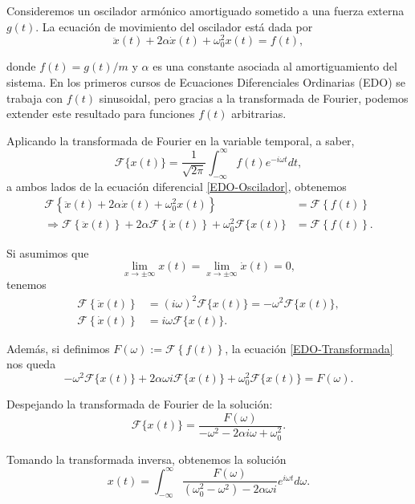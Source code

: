 \begin{ejemplo}
  Consideremos un oscilador armónico amortiguado sometido a una fuerza externa $g(t)$. La ecuación de movimiento del oscilador está dada por
\begin{equation}
 \ddot{x}(t) + 2 \alpha \dot{x}(t) + \omega_0^2 x(t) = f(t), \label{EDO-Oscilador}   
\end{equation}

donde $f(t) = g(t)/m$ y $\alpha$ es una constante asociada al amortiguamiento del sistema. En los primeros cursos de Ecuaciones Diferenciales Ordinarias (EDO) se trabaja con $f(t)$ sinusoidal, pero gracias a la transformada de Fourier, podemos extender este resultado para funciones $f(t)$ arbitrarias. 

Aplicando la transformada de Fourier en la variable temporal, a saber,
\begin{equation}
\mathcal{F}\{x(t)\} = \frac{1}{\sqrt{2\pi}} \int_{-\infty}^{\infty} f(t) e^{-i\omega t} dt,     
\end{equation}
a ambos lados de la ecuación diferencial \eqref{EDO-Oscilador}, obtenemos 
\begin{align}
    \mathcal{F}\left\{ \ddot{x}(t) + 2 \alpha \dot{x}(t) + \omega_0^2 x(t)\right\} &= \mathcal{F}\left\{ f(t)\right\} \nonumber\\
    \Rightarrow   \mathcal{F}\left\{ \ddot{x}(t) \right\} + 2\alpha \mathcal{F}\left\{ \dot{x}(t) \right\} + \omega_0^2 \mathcal{F}\{x(t)\} &= \mathcal{F}\left\{ f(t)\right\}. \label{EDO-Transformada}
\end{align}

Si asumimos que 
\begin{equation}
 \lim_{x \to \pm \infty} x(t) = \lim_{x \to \pm \infty} \dot{x}(t) = 0,   
\end{equation}
tenemos 
\begin{align*}
     \mathcal{F}\left\{ \ddot{x}(t) \right\} &= (i\omega)^2 \mathcal{F}\{x(t)\} = - \omega^2 \mathcal{F}\{x(t)\},\\
      \mathcal{F}\left\{ \dot{x}(t) \right\} &= i \omega \mathcal{F}\{x(t)\}.
\end{align*}

Además, si definimos $F(\omega) := \mathcal{F}\left\{ f(t)\right\}$, la ecuación \eqref{EDO-Transformada} nos queda
\begin{equation}
- \omega^2 \mathcal{F}\{x(t)\} + 2 \alpha \omega i \mathcal{F}\{x(t)\} + \omega_0^2 \mathcal{F}\{x(t)\} = F(\omega).    
\end{equation}

Despejando la transformada de Fourier de la solución:
$$  \mathcal{F}\{x(t)\} = \frac{F(\omega)}{-\omega^2 - 2 \alpha i \omega + \omega_0^2}.$$

Tomando la transformada inversa, obtenemos la solución 
\begin{equation}
x(t) = \int_{-\infty}^{\infty} \frac{F(\omega)}{(\omega_0^2-\omega^2) - 2 \alpha \omega i} e^{i\omega t} d\omega.    
\end{equation}

\end{ejemplo}

